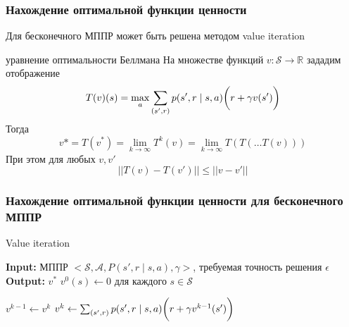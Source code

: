 \documentclass[notheorems]{beamer} %
\begin{document}
\begin{frame}
\frametitle{Нахождение оптимальной функции ценности}


Для бесконечного МППР может быть решена методом value iteration

\begin{block}{уравнение оптимальности Беллмана}
 На множестве функций $v : \mathcal{S} \to \mathbb{R}$ зададим отображение 
 $$T(v)(s) = \max_a \sum_{(s',r)}p(s',r \mid s,a)\bigg{(}r + \gamma v(s')\bigg{)} $$
 Тогда $$v*=T(v^*) = \lim_{k \to \infty}T^k(v) = \lim_{k \to \infty}T(T(\dots T(v)))$$
 При этом для любых $v, v'$ $$ ||T(v)-T(v')|| \leq ||v-v'|| $$
\end{block}
\end{frame}
\begin{frame}
	
	\frametitle{Нахождение оптимальной функции ценности для бесконечного МППР}
	\begin{algorithm}[H]
		\caption{Value iteration}\label{dp}
		\begin{algorithmic}[1]
			\newline
			\textbf{Input:} МППР  $<\mathcal{S}, \mathcal{A}, P(s',r \mid s,a), \gamma>$, требуемая точность решения $ \epsilon $\newline
			\textbf{Output:} $v^* $
			\State $v^0(s) \gets 0 $ для каждого  $s \in  \mathcal{S}$

			\Repeat
			
			\State $v^{k-1} \gets v^k$
			\State $v^{k} \gets  \sum_{(s',r)}p(s',r \mid s,a)\bigg{(}r + \gamma v^{k-1}(s')\bigg{)}$ 
			
			\EndProcedure
		\end{algorithmic}
		\label{alg_1}
	\end{algorithm}
\end{frame}
\end{document}
